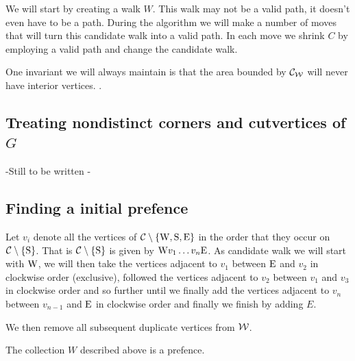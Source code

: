 We will start by creating a walk $W$. This walk may not be a valid path, it doesn't even have to be a path. During the algorithm we will make a number of moves that will turn this candidate walk into a valid path. In each move we shrink $C$ by employing a valid path and change the candidate walk.

One invariant we will always maintain is that the area bounded by $\mathcal{C}_{\mathcal{W}}$ will never have interior vertices. .

\subsection{Treating nondistinct corners and cutvertices of $G$}
-Still to be written -

\subsection{Finding a initial prefence}
Let $v_i$ denote all the vertices of $\mathcal{C} \setminus \left\lbrace {\mathrm{W}, \mathrm{S}, \mathrm{E}} \right\rbrace$ in the order that they occur on $\mathcal{C} \setminus \left\lbrace {\mathrm{S}} \right\rbrace$.  That is $\mathcal{C} \setminus \left\lbrace {\mathrm{S}} \right\rbrace$ is given by $\mathrm{W} v_1 \ldots v_n \mathrm{E}$.
As candidate walk we will start with $\mathrm{W}$, we will then take the vertices adjacent to $v_1$ between $\mathrm{E}$ and $v_2$ in clockwise order (exclusive), followed the vertices adjacent to $v_2$ between $v_1$ and $v_3$ in clockwise order and so further until we finally add the vertices adjacent to $v_n$ between $v_{n-1}$ and $\mathrm{E}$ in clockwise order and finally we finish by adding $E$.

We then remove all subsequent duplicate vertices from $\mathcal{W}$.

\begin{lemma}
The collection $W$ described above is a prefence.
\end{lemma}


